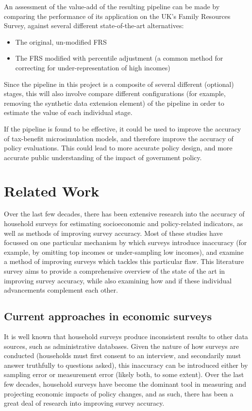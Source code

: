 \documentclass[10pt,journal,compsoc]{IEEEtran}
\begin{document}
An assessment of the value-add of the resulting pipeline can be made by comparing the performance of its application on the UK's Family Resources Survey, against several different state-of-the-art alternatives:

\begin{itemize}
  \item The original, un-modified FRS
  \item The FRS modified with percentile adjustment (a common method for correcting for under-representation of high incomes)
\end{itemize}

Since the pipeline in this project is a composite of several different (optional) stages, this will also involve compare different configurations (for example, removing the synthetic data extension element) of the pipeline in order to estimate the value of each individual stage.

If the pipeline is found to be effective, it could be used to improve the accuracy of tax-benefit microsimulation models, and therefore improve the accuracy of policy evaluations. This could lead to more accurate policy design, and more accurate public understanding of the impact of government policy.

\section{Related Work}

Over the last few decades, there has been extensive research into the accuracy of household surveys for estimating socioeconomic and policy-related indicators, as well as methods of improving survey accuracy. Most of these studies have focussed on one particular mechanism by which surveys introduce inaccuracy (for example, by omitting top incomes or under-sampling low incomes), and examine a method of improving surveys which tackles this particular flaw. This literature survey aims to provide a comprehensive overview of the state of the art in improving survey accuracy, while also examining how and if these individual advancements complement each other.

\subsection{Current approaches in economic surveys}

It is well known that household surveys produce inconsistent results to other data sources, such as administrative databases. Given the nature of how surveys are conducted (households must first consent to an interview, and secondarily must answer truthfully to questions asked), this inaccuracy can be introduced either by sampling error or measurement error (likely both, to some extent). Over the last few decades, household surveys have become the dominant tool in measuring and projecting economic impacts of policy changes, and as such, there has been a great deal of research into improving survey accuracy.
\end{document}
